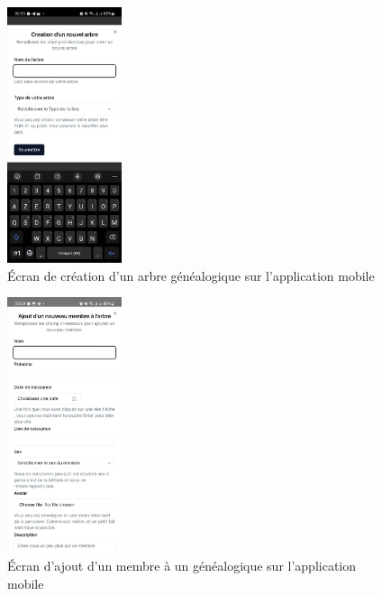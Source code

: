 \begin{figure}[H]
  \centering
  \includegraphics[width=0.3\textwidth]{capture/treem.png}
  \caption{Écran de création d'un arbre généalogique sur l'application mobile}
\end{figure}


\begin{figure}[H]
  \centering
  \includegraphics[width=0.3\textwidth]{capture/memberm.png}
  \caption{Écran d'ajout d'un membre à un généalogique sur l'application mobile}
\end{figure}
